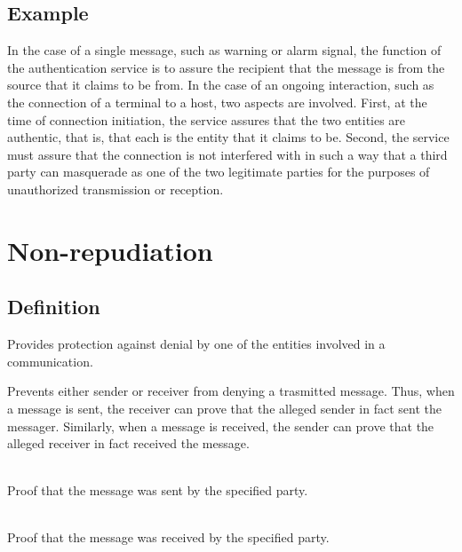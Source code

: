 \documentclass[12pt]{article}
\begin{document}
    	\subsection{Example}
    		In the case of a single message, such as warning or alarm signal, the function of the authentication service is to assure the recipient that the message is from the source that it claims to be from. In the case of an ongoing interaction, such as the connection of a terminal to a host, two aspects are involved. First, at the time of connection initiation, the service assures that the two entities are authentic, that is, that each is the entity that it claims to be. Second, the service must assure that the connection is not interfered with in such a way that a third party can masquerade as one of the two legitimate parties for the purposes of unauthorized transmission or reception.

    \section{Non-repudiation}
    	\subsection{Definition}
    		Provides protection against denial by one of the entities involved in a communication.

    		Prevents either sender or receiver from denying a trasmitted message. Thus, when a message is sent, the receiver can prove that the alleged sender in fact sent the messager. Similarly, when a message is received, the sender can prove that the alleged receiver in fact received the message.

    			\\
    		Proof that the message was sent by the specified party.

    			\\
    		Proof that the message was received by the specified party.
        	
\end{document}
